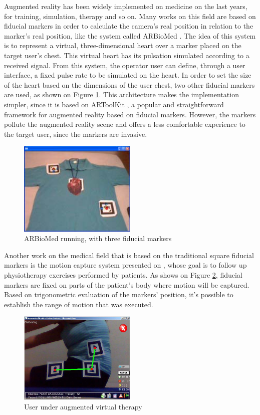 \documentclass[msc, a4paper, classic, en]{ufbathesis}
\begin{document}
Augmented reality has been widely implemented on medicine on the last years, for training, simulation, therapy and so on. Many works on this field are based on fiducial markers in order to calculate the camera's real position in relation to the marker's real position, like the system called ARBioMed \cite{arbiomed}. The idea of this system is to represent a virtual, three-dimensional heart over a marker placed on the target user's chest. This virtual heart has its pulsation simulated according to a received signal. From this system, the operator user can define, through a user interface, a fixed pulse rate to be simulated on the heart. In order to set the size of the heart based on the dimensions of the user chest, two other fiducial markers are used, as shown on Figure \ref{fig:arbiomed}. This architecture makes the implementation simpler, since it is based on ARToolKit \cite{artoolkit}, a popular and straightforward framework for augmented reality based on fiducial markers. However, the markers pollute the augmented reality scene and offers a less comfortable experience to the target user, since the markers are invasive.

\begin{figure}
\label{fig:arbiomed}
\centering
\includegraphics[width=0.5\textwidth]{images/arbiomed.png}
\caption{ARBioMed running, with three fiducial markers \cite{arbiomed}}
\end{figure}

Another work on the medical field that is based on the traditional square fiducial markers is the motion capture system presented on \cite{fisio}, whose goal is to follow up physiotherapy exercises performed by patients. As shows on Figure \ref{fig:fisio}, fiducial markers are fixed on parts of the patient's body where motion will be captured. Based on trigonometric evaluation of the markers' position, it's possible to establish the range of motion that was executed.

\begin{figure}
\label{fig:fisio}
\centering
\includegraphics[width=0.5\textwidth]{images/fisio.png}
\caption{User under augmented virtual therapy \cite{fisio}}
\end{figure}
\end{document}
